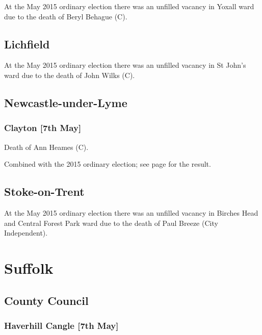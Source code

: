 \documentclass[a4paper,openany]{book}
\begin{document}
\begin{resultsiii}
At the May 2015 ordinary election there was an unfilled vacancy in Yoxall ward due to the death of Beryl Behague (C).

\subsection*{Lichfield}

At the May 2015 ordinary election there was an unfilled vacancy in St John's ward due to the death of John Wilks (C).

\subsection*{Newcastle-under-Lyme}

\subsubsection*{Clayton \hspace*{\fill}\nolinebreak[1]%
\enspace\hspace*{\fill}
[7th May]}


Death of Ann Heames (C).

Combined with the 2015 ordinary election; see page \pageref{ClaytonNewcastleLyme} for the result.

\subsection*{Stoke-on-Trent}

At the May 2015 ordinary election there was an unfilled vacancy in Birches Head and Central Forest Park ward due to the death of Paul Breeze (City Independent).

\section{Suffolk}

\subsection*{County Council}

\subsubsection*{Haverhill Cangle \hspace*{\fill}\nolinebreak[1]%
\enspace\hspace*{\fill}
[7th May]}


\end{resultsiii}
\end{document}
